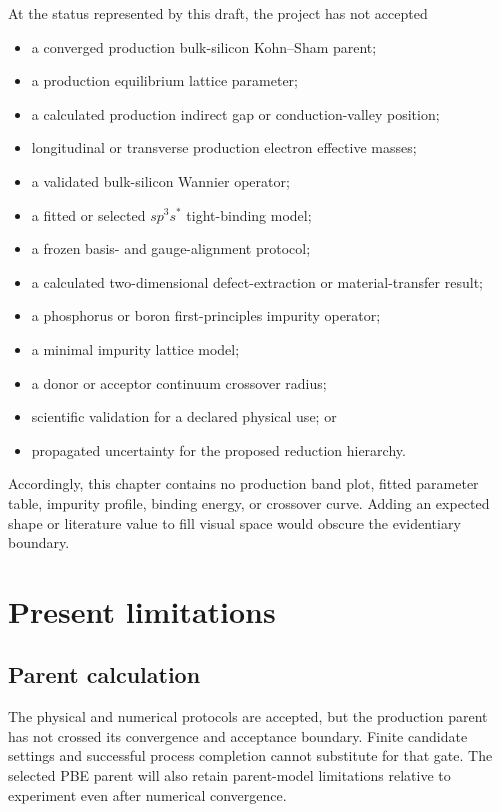 At the status represented by this draft, the project has not accepted

\begin{itemize}
  \item a converged production bulk-silicon Kohn--Sham parent;
  \item a production equilibrium lattice parameter;
  \item a calculated production indirect gap or conduction-valley position;
  \item longitudinal or transverse production electron effective masses;
  \item a validated bulk-silicon Wannier operator;
  \item a fitted or selected $sp^3s^{\ast}$ tight-binding model;
  \item a frozen basis- and gauge-alignment protocol;
  \item a calculated two-dimensional defect-extraction or material-transfer
    result;
  \item a phosphorus or boron first-principles impurity operator;
  \item a minimal impurity lattice model;
  \item a donor or acceptor continuum crossover radius;
  \item scientific validation for a declared physical use; or
  \item propagated uncertainty for the proposed reduction hierarchy.
\end{itemize}

Accordingly, this chapter contains no production band plot, fitted parameter
table, impurity profile, binding energy, or crossover curve. Adding an expected
shape or literature value to fill visual space would obscure the evidentiary
boundary.

\section{Present limitations}


\subsection{Parent calculation}

The physical and numerical protocols are accepted, but the production parent
has not crossed its convergence and acceptance boundary. Finite candidate
settings and successful process completion cannot substitute for that gate.
The selected PBE parent will also retain parent-model limitations relative to
experiment even after numerical convergence.

